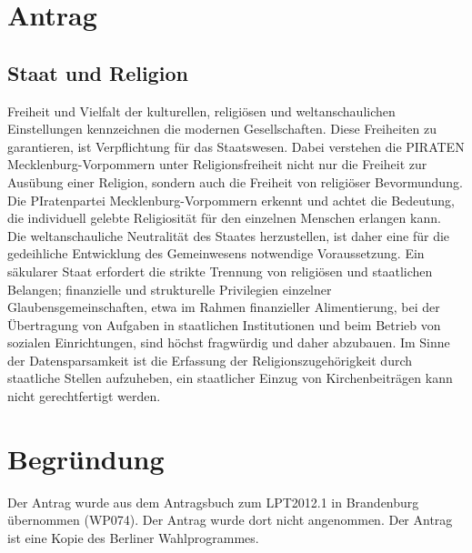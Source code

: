 \section{Antrag}

\subsection{Staat und Religion}

Freiheit und Vielfalt der kulturellen, religiösen und weltanschaulichen Einstellungen kennzeichnen die modernen Gesellschaften. Diese Freiheiten zu garantieren, ist Verpflichtung für das Staatswesen. Dabei verstehen die PIRATEN Mecklenburg-Vorpommern unter Religionsfreiheit nicht nur die Freiheit zur Ausübung einer Religion, sondern auch die Freiheit von religiöser Bevormundung. Die PIratenpartei Mecklenburg-Vorpommern erkennt und achtet die Bedeutung, die individuell gelebte Religiosität für den einzelnen Menschen erlangen kann.\\Die weltanschauliche Neutralität des Staates herzustellen, ist daher eine für die gedeihliche Entwicklung des Gemeinwesens notwendige Voraussetzung. Ein säkularer Staat erfordert die strikte Trennung von religiösen und staatlichen Belangen; finanzielle und strukturelle Privilegien einzelner Glaubensgemeinschaften, etwa im Rahmen finanzieller Alimentierung, bei der Übertragung von Aufgaben in staatlichen Institutionen und beim Betrieb von sozialen Einrichtungen, sind höchst fragwürdig und daher abzubauen. Im Sinne der Datensparsamkeit ist die Erfassung der Religionszugehörigkeit durch staatliche Stellen aufzuheben, ein staatlicher Einzug von Kirchenbeiträgen kann nicht gerechtfertigt werden.

\section{Begründung}

Der Antrag wurde aus dem Antragsbuch zum LPT2012.1 in Brandenburg übernommen (WP074). Der Antrag wurde dort nicht angenommen. Der Antrag ist eine Kopie des Berliner Wahlprogrammes.
